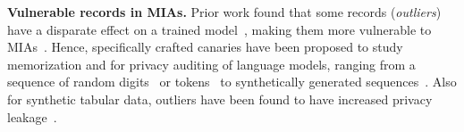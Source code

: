 \textbf{Vulnerable records in MIAs.} 
Prior work found that some records (\emph{outliers}) have a disparate effect on a trained model~\citep{feldman2020neural}, making them more vulnerable to MIAs~\citep{carlini2022membership,carlini2022privacy}. Hence, specifically crafted canaries have been proposed to study memorization and for privacy auditing of language models, ranging from a sequence of random digits~\citep{carlini2019secret,stock2022defending} or tokens~\citep{wei2024proving} to synthetically generated sequences~\citep{meeuscopyright}. Also for synthetic tabular data, outliers have been found to have increased privacy leakage~\citep{stadler2022synthetic,meeus2023achilles}.

